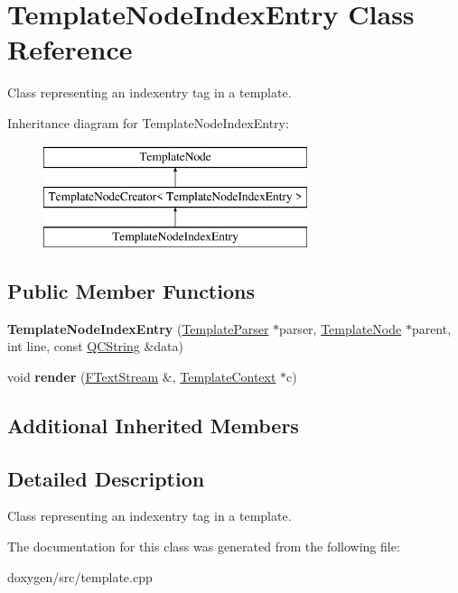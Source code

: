 \hypertarget{class_template_node_index_entry}{}\section{Template\+Node\+Index\+Entry Class Reference}
\label{class_template_node_index_entry}


Class representing an \textquotesingle{}indexentry\textquotesingle{} tag in a template.  


Inheritance diagram for Template\+Node\+Index\+Entry\+:\begin{figure}[H]
\begin{center}
\leavevmode
\includegraphics[height=3.000000cm]{class_template_node_index_entry}
\end{center}
\end{figure}
\subsection*{Public Member Functions}
\begin{DoxyCompactItemize}
\item 
\mbox{\label{class_template_node_index_entry_a39d627f91dbb680c38f9215ae7a2c9c6}} 
{\bfseries Template\+Node\+Index\+Entry} (\mbox{\hyperlink{class_template_parser}{Template\+Parser}} $\ast$parser, \mbox{\hyperlink{class_template_node}{Template\+Node}} $\ast$parent, int line, const \mbox{\hyperlink{class_q_c_string}{Q\+C\+String}} \&data)
\item 
\mbox{\label{class_template_node_index_entry_acc7c6d66ec1082be2906923dd46dbafe}} 
void {\bfseries render} (\mbox{\hyperlink{class_f_text_stream}{F\+Text\+Stream}} \&, \mbox{\hyperlink{class_template_context}{Template\+Context}} $\ast$c)
\end{DoxyCompactItemize}
\subsection*{Additional Inherited Members}


\subsection{Detailed Description}
Class representing an \textquotesingle{}indexentry\textquotesingle{} tag in a template. 

The documentation for this class was generated from the following file\+:\begin{DoxyCompactItemize}
\item 
doxygen/src/template.\+cpp\end{DoxyCompactItemize}

